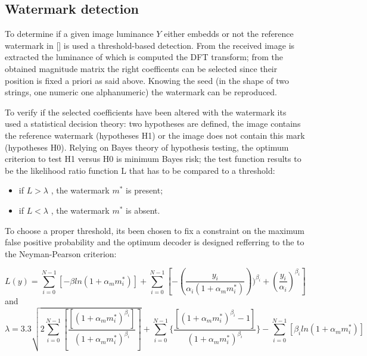 \subsection{Watermark detection}

To determine if a given image luminance $Y$ either embedds or not the reference watermark in [] is used a threshold-based detection.\newline
From the received image is extracted the luminance of which is computed the DFT transform; from the obtained magnitude matrix the right coefficents can be selected since their position is fixed a priori as said above.\newline
Knowing the seed (in the shape of two strings, one numeric one alphanumeric) the watermark can be reproduced.\newline

To verify if the selected coefficients have been altered with the watermark its used a statistical decision theory: two hypotheses are defined, the image contains the reference watermark (hypotheses H1) or the image does not contain this mark (hypotheses H0). Relying on Bayes theory of hypothesis testing, the optimum criterion to test H1 versus H0 is minimum Bayes risk; the test function results to be the likelihood ratio function L that has to be compared to a threshold:\newline
\begin{itemize}
\item if $L > \lambda$ ,  the watermark $m^{*}$ is present;
\item if $L < \lambda$ , the watermark  $m^{*}$ is absent.
\end{itemize}

To choose a proper threshold, its been chosen to fix a constraint on the maximum false positive probability and the optimum decoder is designed refferring to the to the Neyman-Pearson criterion: \newline

$$ L(y)=\sum_{i=0}^{N-1} [-\beta ln(1+\alpha_{m}m_{i}^{*})]+\sum_{i=0}^{N-1}[-(\frac{y_{i}}{\alpha_{i}(1+\alpha_{m}m_{i}^{*})}))^{\beta_{i}}+(\frac{y_{i}}{\alpha_{i}})^{\beta_{i}}] $$
and
$$\lambda=3.3\sqrt{2\sum_{i=0}^{N-1}[\frac{[(1+\alpha_{m}m_{i}^{*})^{\beta_{i}}]}{(1+\alpha_{m}m_{i}^{*})^{\beta_{i}}}]} + \sum_{i=0}^{N-1}\{\frac{[(1+\alpha_{m}m_{i}^{*})^{\beta_{i}}-1]}{(1+\alpha_{m}m_{i}^{*})^{\beta_{i}}}\} - \sum_{i=0}^{N-1}[\beta_{i}ln(1+\alpha_{m}m_{i}^{*})]$$

